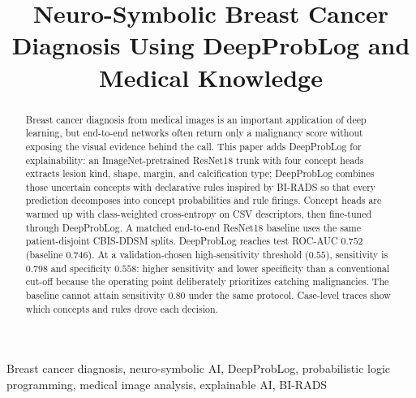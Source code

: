 \documentclass[conference]{IEEEtran}
\begin{document}
\title{Neuro-Symbolic Breast Cancer Diagnosis Using DeepProbLog and Medical Knowledge}



\maketitle

\begin{abstract}
Breast cancer diagnosis from medical images is an important application of deep learning, but end-to-end networks often return only a malignancy score without exposing the visual evidence behind the call. This paper adds DeepProbLog for explainability: an ImageNet-pretrained ResNet18 trunk with four concept heads extracts lesion kind, shape, margin, and calcification type; DeepProbLog combines those uncertain concepts with declarative rules inspired by BI-RADS so that every prediction decomposes into concept probabilities and rule firings. Concept heads are warmed up with class-weighted cross-entropy on CSV descriptors, then fine-tuned through DeepProbLog. A matched end-to-end ResNet18 baseline uses the same patient-disjoint CBIS-DDSM splits. DeepProbLog reaches test ROC-AUC $0.752$ (baseline $0.746$). At a validation-chosen high-sensitivity threshold ($0.55$), sensitivity is $0.798$ and specificity $0.558$: higher sensitivity and lower specificity than a conventional cut-off because the operating point deliberately prioritizes catching malignancies. The baseline cannot attain sensitivity $0.80$ under the same protocol. Case-level traces show which concepts and rules drove each decision.
\end{abstract}

\begin{IEEEkeywords}
Breast cancer diagnosis, neuro-symbolic AI, DeepProbLog, probabilistic logic programming, medical image analysis, explainable AI, BI-RADS
\end{IEEEkeywords}










\end{document}
